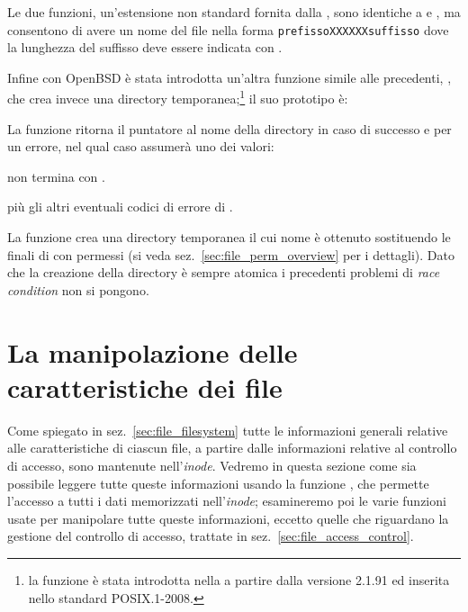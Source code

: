Le due funzioni, un'estensione non standard fornita dalla , sono
identiche a  e , ma consentono di avere un nome
del file nella forma \texttt{prefissoXXXXXXsuffisso} dove la lunghezza del
suffisso deve essere indicata con .

Infine con OpenBSD è stata introdotta un'altra funzione simile alle
precedenti, , che crea invece una directory
temporanea;\footnote{la funzione è stata introdotta nella  a
  partire dalla versione 2.1.91 ed inserita nello standard POSIX.1-2008.}  il
suo prototipo è:

\begin{funcproto}{
}
{La funzione ritorna il puntatore al nome della directory in caso di successo
  e  per un errore, nel qual caso  assumerà uno dei
  valori:
  \begin{errlist}
    \item[\errcode{EINVAL}]  non termina con .
  \end{errlist}
  più gli altri eventuali codici di errore di .}
\end{funcproto}

La funzione crea una directory temporanea il cui nome è ottenuto sostituendo
le  finali di  con permessi  (si veda
sez.~\ref{sec:file_perm_overview} per i dettagli). Dato che la creazione della
directory è sempre atomica i precedenti problemi di \textit{race condition}
non si pongono.


\section{La manipolazione delle caratteristiche dei file}
\label{sec:file_infos}

Come spiegato in sez.~\ref{sec:file_filesystem} tutte le informazioni generali
relative alle caratteristiche di ciascun file, a partire dalle informazioni
relative al controllo di accesso, sono mantenute nell'\textit{inode}. Vedremo
in questa sezione come sia possibile leggere tutte queste informazioni usando
la funzione , che permette l'accesso a tutti i dati memorizzati
nell'\textit{inode}; esamineremo poi le varie funzioni usate per manipolare
tutte queste informazioni, eccetto quelle che riguardano la gestione del
controllo di accesso, trattate in sez.~\ref{sec:file_access_control}.


